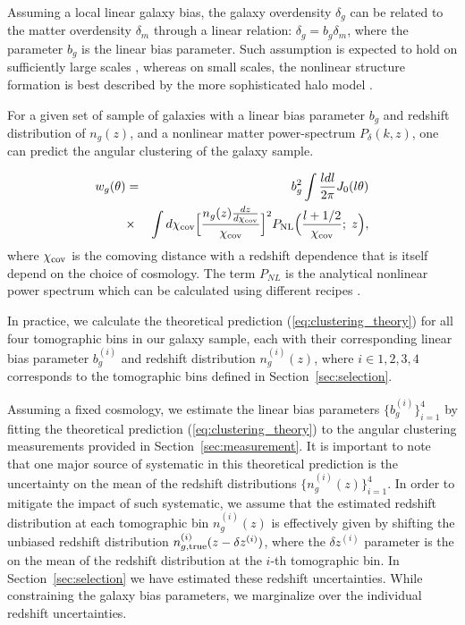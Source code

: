 \documentclass[fleqn,usenatbib,useAMS]{mnras}
\begin{document}
Assuming a local linear galaxy bias, the galaxy overdensity $\delta_g$ can be related to the matter overdensity $\delta_m$ through a linear relation: $\delta_g = b_g \delta_m$, where the parameter $b_g$ is the linear bias parameter. Such assumption is expected to hold on sufficiently large scales \citep[e.g.][]{dvornik2018}, whereas on small scales, the nonlinear structure formation is best described by the more sophisticated halo model \citep[e.g. ][]{hand2017,vakili_hahn}.

For a given set of sample of galaxies with a linear bias parameter $b_g$ and redshift distribution of $n_g(z)$, and a nonlinear matter power-spectrum $P_{\delta}(k,z)$, one can predict the angular clustering of the galaxy sample.

\begin{eqnarray}
w_{g}(\theta) &=& b_g^2 \int \frac{l dl}{2\pi}J_{0}(l\theta)  \nonumber \\ 
            &\times& \int d\chi_{\rm cov} \Big[\frac{n_{g}(z)\frac{dz}{d\chi_{\rm cov}}}{\chi_{\rm cov}}\Big]^{2}P_{\rm NL}\Big(\frac{l+1/2}{\chi_{\rm cov}}; \; z\Big),                  
\label{eq:clustering_theory}
\end{eqnarray}
where $\chi_{\rm cov}$ is the comoving distance with a redshift dependence that is itself depend on the choice of cosmology. The term $P_{NL}$ is the analytical nonlinear power spectrum which can be calculated using different recipes  \citep[e.g. ][]{takahashi2012, emu2014,mead2015, smith2019}.

In practice, we calculate the theoretical prediction (\ref{eq:clustering_theory}) for all four tomographic bins in our galaxy sample, each with their corresponding linear bias parameter $b^{(i)}_{g}$ and redshift distribution $n^{(i)}_{g}(z)$, where $i\in {1,2,3,4}$ corresponds to the tomographic bins defined in Section~\ref{sec:selection}.

Assuming a fixed cosmology, we estimate the linear bias parameters $\{b^{(i)}_{g}\}_{i=1}^{4}$ by fitting the theoretical prediction (\ref{eq:clustering_theory}) to the angular clustering measurements provided in Section~\ref{sec:measurement}. It is important to note that one major source of systematic in this theoretical prediction is the uncertainty on the mean of the redshift distributions $\{n_{g}^{(i)}(z)\}_{i=1}^{4}$. In order to mitigate the impact of such systematic, we assume that the estimated redshift distribution at each tomographic bin $n_{g}^{(i)}(z)$ is effectively given by shifting the unbiased redshift distribution $n_{g, \rm true}^{(i)}(z - \delta z^{(i)})$, where the $\delta z^{(i)}$ parameter is the on the mean of the redshift distribution at the $i$-th tomographic bin. In Section~\ref{sec:selection} we have estimated these redshift uncertainties. While constraining the galaxy bias parameters, we marginalize over the individual redshift uncertainties. 
\end{document}
